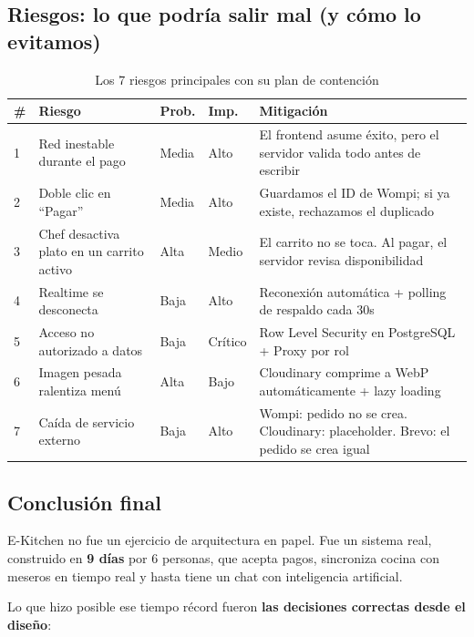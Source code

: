 \documentclass[12pt,a4paper]{article}
\begin{document}
\subsection{Riesgos: lo que podría salir mal (y cómo lo evitamos)}

\begin{table}[H]
\centering
{}
\small
\begin{tabular}{p{0.5cm} p{3.5cm} p{1.1cm} p{1.1cm} p{5.5cm}}
\toprule
\rowcolor{mateo!20}\textbf{\#} & \textbf{Riesgo} & \textbf{Prob.} & \textbf{Imp.} & \textbf{Mitigación} \\
\midrule
1 & Red inestable durante el pago & Media & Alto & El frontend asume éxito, pero el servidor valida todo antes de escribir \\
2 & Doble clic en ``Pagar'' & Media & Alto & Guardamos el ID de Wompi; si ya existe, rechazamos el duplicado \\
3 & Chef desactiva plato en un carrito activo & Alta & Medio & El carrito no se toca. Al pagar, el servidor revisa disponibilidad \\
4 & Realtime se desconecta & Baja & Alto & Reconexión automática + polling de respaldo cada 30s \\
5 & Acceso no autorizado a datos & Baja & Crítico & Row Level Security en PostgreSQL + Proxy por rol \\
6 & Imagen pesada ralentiza menú & Alta & Bajo & Cloudinary comprime a WebP automáticamente + lazy loading \\
7 & Caída de servicio externo & Baja & Alto & Wompi: pedido no se crea. Cloudinary: placeholder. Brevo: el pedido se crea igual \\
\bottomrule
\end{tabular}
\caption{Los 7 riesgos principales con su plan de contención}
\end{table}

\subsection{Conclusión final}

E-Kitchen no fue un ejercicio de arquitectura en papel. Fue un sistema real, construido en \textbf{9 días} por 6 personas, que acepta pagos, sincroniza cocina con meseros en tiempo real y hasta tiene un chat con inteligencia artificial.

Lo que hizo posible ese tiempo récord fueron \textbf{las decisiones correctas desde el diseño}:
\end{document}
